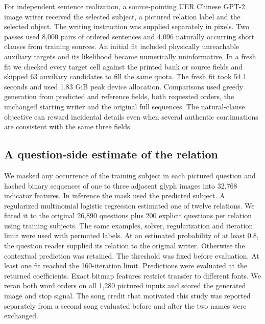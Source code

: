 \documentclass[12pt,a4paper]{article}
\providecommand{\DIFadd}[1]{{\protect\color{blue} \sf #1}} %
\begin{document}
\DIFadd{For independent sentence realization, a source-pointing UER Chinese GPT-2 image writer received the selected subject, a pictured relation label and the selected object. The writing instruction was supplied separately in pixels. Two passes used 8,000 pairs of ordered sentences and 4,096 naturally occurring short clauses from training sources. An initial fit included physically unreachable auxiliary targets and its likelihood became numerically uninformative. In a fresh fit we checked every target cell against the printed bank or source fields and skipped 63 auxiliary candidates to fill the same quota. The fresh fit took 54.1 seconds and used 1.83 GiB peak device allocation. Comparisons used greedy generation from predicted and reference fields, both requested orders, the unchanged starting writer and the original full sequences. The natural-clause objective can reward incidental details even when several authentic continuations are consistent with the same three fields.
}

\subsection*{\DIFadd{A question-side estimate of the relation}}
\DIFadd{We masked any occurrence of the training subject in each pictured question and hashed binary sequences of one to three adjacent glyph images into 32,768 indicator features. In inference the mask used the predicted subject. A regularized multinomial logistic regression estimated one of twelve relations. We fitted it to the original 26,890 questions plus 200 explicit questions per relation using training subjects. The same examples, solver, regularization and iteration limit were used with permuted labels. At an estimated probability of at least 0.8, the question reader supplied its relation to the original writer. Otherwise the contextual prediction was retained. The threshold was fixed before evaluation. At least one fit reached the 160-iteration limit. Predictions were evaluated at the returned coefficients. Exact bitmap features restrict transfer to different fonts. We reran both word orders on all 1,280 pictured inputs and scored the generated image and stop signal. The song credit that motivated this study was reported separately from a second song evaluated before and after the two names were exchanged.
}
\end{document}
